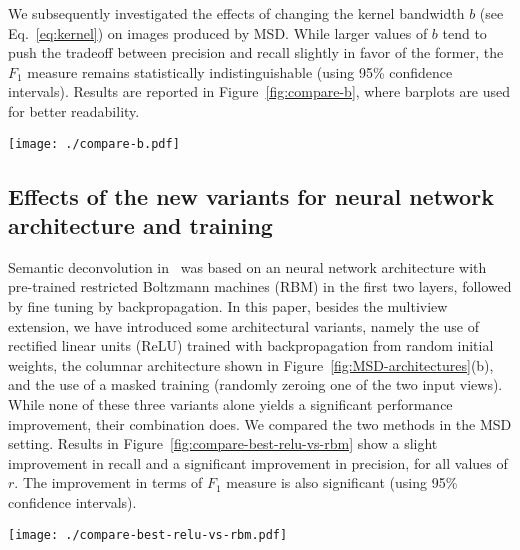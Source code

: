 \documentclass[smallextended]{svjour3}       %
\begin{document}
We subsequently investigated the effects of changing the kernel
bandwidth $b$ (see Eq.~\ref{eq:kernel}) on images produced by MSD. While larger values of $b$
tend to push the tradeoff between precision and recall slightly in
favor of the former, the $F_1$ measure remains statistically
indistinguishable (using 95\% confidence intervals). Results are
reported in Figure~\ref{fig:compare-b}, where barplots are used for
better readability.

\begin{figure*}
  \centering
  \texttt{[image: ./compare-b.pdf]}
  \caption{Performance of mean shift after MSD when changing the kernel bandwidth $b$ and the seed radius $r$.}
  \label{fig:compare-b}
\end{figure*}


\subsection{Effects of the new variants for neural network architecture and training}
Semantic deconvolution in~\cite{frasconi_large-scale_2014} was based
on an neural network architecture with pre-trained restricted Boltzmann
machines (RBM) in the first two layers, followed by fine tuning by
backpropagation. In this paper, besides the multiview extension, we
have introduced some architectural variants, namely the use of
rectified linear units (ReLU) trained with backpropagation from random
initial weights, the columnar architecture shown in
Figure~\ref{fig:MSD-architectures}(b), and the use of a masked
training (randomly zeroing one of the two input views). While
none of these three variants alone yields a significant performance
improvement, their combination does. We compared the two methods in
the MSD setting. Results in Figure~\ref{fig:compare-best-relu-vs-rbm}
show a slight improvement in recall and a significant improvement in
precision, for all values of $r$. The improvement in terms of $F_1$
measure is also significant (using 95\% confidence intervals).
\begin{figure*}
  \centering
  \texttt{[image: ./compare-best-relu-vs-rbm.pdf]}
  \caption{MSD: comparison between the former finely tuned RBM
    architecture~\cite{frasconi_large-scale_2014} and the new
    architecture based on ReLUs, columnar structure, and masked
    training.}
  \label{fig:compare-best-relu-vs-rbm}
\end{figure*}
\end{document}
